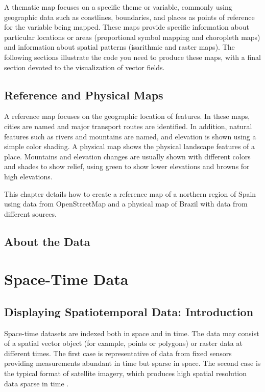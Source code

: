 \documentclass[smallroyalvopaper]{memoir}
\begin{document}
A thematic map focuses on a specific theme or variable, commonly using geographic data such as coastlines, boundaries, and places as points of reference for the variable being mapped. These maps provide specific information about particular locations or areas (proportional symbol mapping and choropleth maps) and information about spatial patterns (isarithmic and raster maps). The following sections illustrate the code you need to produce these maps, with a final section devoted to the visualization of vector fields.

\chapter{Reference and Physical Maps}
\label{sec:orgheadline35}
\label{cha:refer-phys-maps}

A reference map focuses on the geographic location of features. In these maps, cities are named and major transport routes are identified. In addition, natural features such as rivers and mountains are named, and elevation is shown using a simple color shading.
A physical map shows the physical landscape features of a place.  Mountains and elevation changes are usually shown with different colors and shades to show relief, using green to show lower elevations and browns for high elevations.

This chapter details how to create a reference map of a northern region of Spain using data from OpenStreetMap and a physical map of Brazil with data from different sources.

\chapter{About the Data}
\label{sec:orgheadline36}
\label{cha:dataSpatial}

\part{Space-Time Data}
\label{sec:orgheadline46}

\chapter{Displaying Spatiotemporal Data: Introduction}
\label{sec:orgheadline43}
\label{cha:introductionST}

Space-time datasets are indexed both in space and in time. The data may consist of a spatial vector object (for example, points or polygons) or raster data at different times. The first case is representative of data from fixed sensors providing measurements abundant in time but sparse in space. The second case is the typical format of satellite imagery, which produces high spatial resolution data sparse in time \cite{Pebesma2012}.
\end{document}

